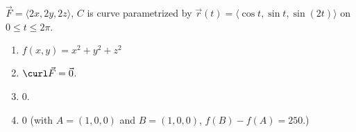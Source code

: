 {$\vec F = \langle 2x, 2y, 2z\rangle$, $C$ is curve parametrized by $\vec r(t) = \langle \cos t,\sin t, \sin (2t)\rangle$ on $0\leq t\leq 2\pi$. 
}
{\begin{enumerate}
\item		$f(x,y) = x^2+y^2+z^2$
\item	$\curl \vec F = \vec 0$.
\item		$0$.%
\item	$0$ (with $A = (1,0,0)$ and $B = (1,0,0)$, $f(B) - f(A) = 250$.)
\end{enumerate}
}
